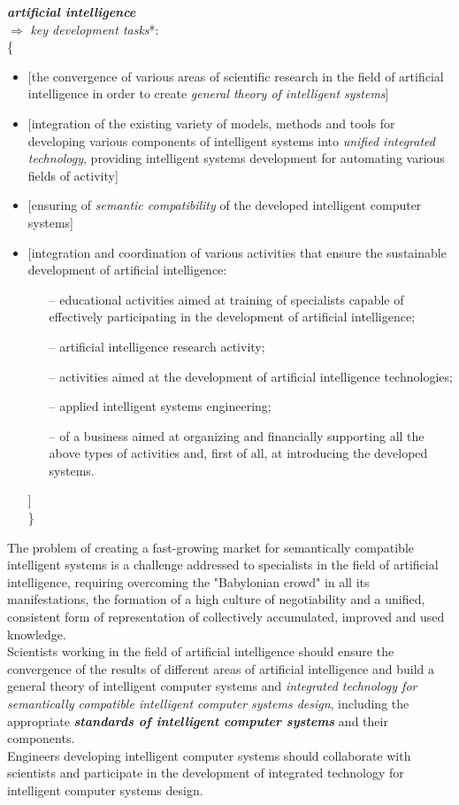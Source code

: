 \documentclass[10pt, a4paper]{proc}
\begin{document}
 \noindent\textbf{\textit{artificial intelligence}}\\
 \(\Rightarrow\) \textit{key development tasks}*:\\
 \{
 \begin{itemize}
  \item \([\)the convergence of various areas of scientific research in the field of artificial intelligence in order to create \textit{general theory of intelligent systems}]
  \item \([\)integration of the existing variety of models, methods and tools for developing various components of intelligent systems into \textit{unified integrated technology}, providing intelligent systems development for automating various fields of activity]
  \item \([\)ensuring of \textit{semantic compatibility} of the developed intelligent computer systems]
  \item \([\)integration and coordination of various activities that ensure the sustainable development of artificial intelligence:
  \begin{enumerate}
   \item[--] educational activities aimed at training of specialists capable of effectively participating in the development of artificial intelligence;
   \item[--] artificial intelligence research activity;
   \item[--] activities aimed at the development of artificial intelligence technologies;
   \item[--] applied intelligent systems engineering;
   \item[--] of a business aimed at organizing and financially supporting all the above types of activities and, first of all, at introducing the developed systems.
  \end{enumerate}
  \quad]\\
  \}
 \end{itemize}
 \quad The problem of creating a fast-growing market for semantically compatible intelligent systems is a challenge addressed to specialists in the field of artificial intelligence, requiring overcoming the "Babylonian crowd" in all its manifestations, the formation of a high culture of negotiability and a unified, consistent form of representation of collectively accumulated, improved and used knowledge.\\
 \indent Scientists working in the field of artificial intelligence should ensure the convergence of the results of different areas of artificial intelligence and build a general theory of intelligent computer systems and \textit{integrated technology for semantically compatible intelligent computer systems design}, including the appropriate \textit{\textbf{standards of intelligent computer systems}} and their components.\\
 \indent Engineers developing intelligent computer systems should collaborate with scientists and participate in the development of integrated technology for intelligent computer systems design.\\
\end{document}
